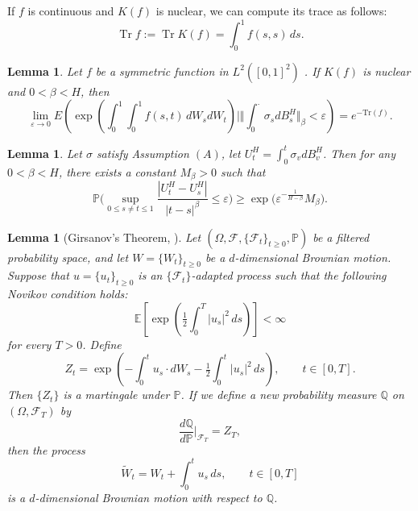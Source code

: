 \documentclass{article}
\newtheorem{lemma}[theorem]{Lemma}
\theoremstyle{definition}  %
\theoremstyle{plain}  %
\begin{document}
If $f$ is continuous and $K(f)$ is nuclear, we can compute its trace as follows:
\[
\operatorname{Tr} f := \operatorname{Tr} K(f) = \int_0^1 f(s,s)\,ds.
\]

	\begin{lemma}\label{estimate2}
Let \( f \) be a symmetric function in \( L^{2}([0,1]^{2}) \) . If \( K(f) \) is nuclear  and $0<\beta<H$, then 
\[
\lim _{\varepsilon \to 0} E\left( \exp \left( \int_{0}^{1} \int_{0}^{1} f(s, t) \, d W_{s} d W_{t} \right) \mid \Vert\int_0^\cdot \sigma_s dB^H_s \Vert_\beta < \varepsilon \right) = e^{-\text{Tr}(f)}.
\]
\end{lemma}




	
	
\begin{lemma}
Let $ \sigma $ satisfy Assumption \((A)\), let $U_t^H=\int_0^t \sigma_vdB^H_v$.
Then for any $0 < \beta < H$, there exists a constant $M_\beta > 0$ such that
\begin{equation}
\mathbb{P}\Bigg(
\sup_{0 \leq s \neq t \leq 1} \frac{|U^H_t - U^H_s|}{|t-s|^\beta} \leq \varepsilon
\Bigg) 
\geq \exp\Big(\varepsilon^{-\frac{1}{H-\beta}} M_\beta \Big). \label{smbp}
\end{equation}
\end{lemma}



\begin{lemma}[Girsanov's Theorem, {\cite[Theorem~8.6]{Oksendal2014}}]\label{lem:girsanov}
Let $(\Omega,\mathcal{F},\{\mathcal{F}_t\}_{t\ge0},\mathbb{P})$ be a filtered probability space, and let 
$W=\{W_t\}_{t\ge0}$ be a $d$-dimensional Brownian motion. 
Suppose that $u=\{u_t\}_{t\ge0}$ is an $\{\mathcal{F}_t\}$-adapted process such that the following Novikov condition holds:
\begin{equation}
    \mathbb{E}\left[\exp\left(\tfrac{1}{2}\int_0^T |u_s|^2\,ds\right)\right] < \infty      \label{novikov}
\end{equation}
for every $T>0$. Define
\[
Z_t = \exp\left(-\int_0^t u_s \cdot dW_s - \tfrac{1}{2}\int_0^t |u_s|^2\,ds\right), 
\qquad t \in [0,T].
\]
Then $\{Z_t\}$ is a martingale under $\mathbb{P}$. If we define a new probability measure 
$\mathbb{Q}$ on $(\Omega,\mathcal{F}_T)$ by
\[
\frac{d\mathbb{Q}}{d\mathbb{P}}\Big|_{\mathcal{F}_T} = Z_T,
\]
then the process
\[
\widetilde{W}_t = W_t + \int_0^t u_s\,ds, \qquad t \in [0,T]
\]
is a $d$-dimensional Brownian motion with respect to $\mathbb{Q}$.
\end{lemma}
\end{document}
